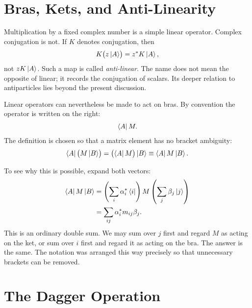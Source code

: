 \section{Bras, Kets, and Anti-Linearity}

\begin{classroomqa}
\end{classroomqa}

Multiplication by a fixed complex number is a simple linear operator. Complex conjugation is not. If \(K\) denotes conjugation, then
\[
K\bigl(z\left\lvert A\right\rangle\bigr)=z^*K\left\lvert A\right\rangle,
\]
not \(zK\left\lvert A\right\rangle\). Such a map is called \emph{anti-linear}. The name does not mean the opposite of linear; it records the conjugation of scalars. Its deeper relation to antiparticles lies beyond the present discussion.

Linear operators can nevertheless be made to act on bras. By convention the operator is written on the right:
\begin{equation}
\left\langle A\right\rvert M.
\end{equation}
The definition is chosen so that a matrix element has no bracket ambiguity:
\begin{equation}
\left\langle A\right\rvert\bigl(M\left\lvert B\right\rangle\bigr)
=
\bigl(\left\langle A\right\rvert M\bigr)\left\lvert B\right\rangle
\equiv
\left\langle A\right\rvert M\left\lvert B\right\rangle.
\label{eq:bracket-independence}
\end{equation}

To see why this is possible, expand both vectors:
\begin{align}
\left\langle A\right\rvert M\left\lvert B\right\rangle
 &=\left(\sum_i\alpha_i^*\left\langle i\right\rvert\right)
   M
   \left(\sum_j\beta_j\left\lvert j\right\rangle\right)\\
 &=\sum_{ij}\alpha_i^*m_{ij}\beta_j.
\label{eq:matrix-element-double-sum}
\end{align}
This is an ordinary double sum. We may sum over \(j\) first and regard \(M\) as acting on the ket, or sum over \(i\) first and regard it as acting on the bra. The answer is the same. The notation was arranged this way precisely so that unnecessary brackets can be removed.

\section{The Dagger Operation}

